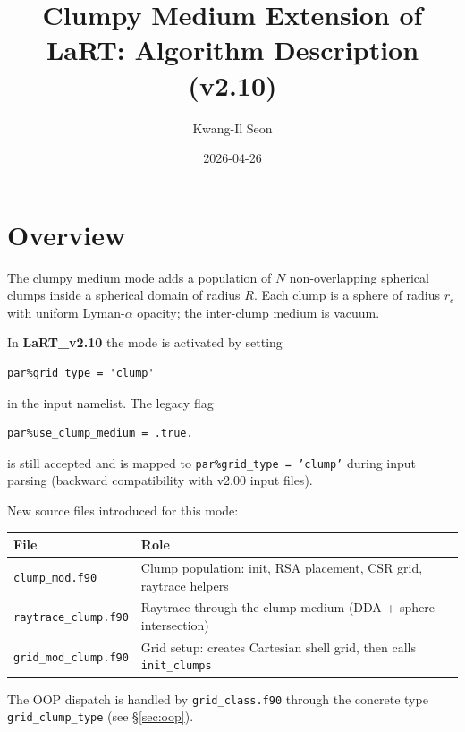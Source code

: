 \documentclass[english,a4paper]{my_memo}
\begin{document}
\title{Clumpy Medium Extension of LaRT: Algorithm Description (v2.10)}
\author{Kwang-Il Seon}
\date{2026-04-26}
\maketitle

\tableofcontents
\bigskip

\section{Overview}

The clumpy medium mode adds a population of $N$ non-overlapping spherical
clumps inside a spherical domain of radius $R$.  Each clump is a sphere of
radius $r_c$ with uniform Lyman-$\alpha$ opacity; the inter-clump medium is
vacuum.

In \textbf{LaRT\_v2.10} the mode is activated by setting
\begin{lstlisting}
par%grid_type = 'clump'
\end{lstlisting}
in the input namelist.  The legacy flag
\begin{lstlisting}
par%use_clump_medium = .true.
\end{lstlisting}
is still accepted and is mapped to \texttt{par\%grid\_type = 'clump'} during
input parsing (backward compatibility with v2.00 input files).

New source files introduced for this mode:
\begin{center}
\begin{tabular}{ll}
\hline
File & Role \\
\hline
\texttt{clump\_mod.f90}       & Clump population: init, RSA placement, CSR grid, raytrace helpers \\
\texttt{raytrace\_clump.f90}  & Raytrace through the clump medium (DDA + sphere intersection) \\
\texttt{grid\_mod\_clump.f90} & Grid setup: creates Cartesian shell grid, then calls \texttt{init\_clumps} \\
\hline
\end{tabular}
\end{center}

The OOP dispatch is handled by \texttt{grid\_class.f90} through the concrete
type \texttt{grid\_clump\_type} (see \S\ref{sec:oop}).

\end{document}
